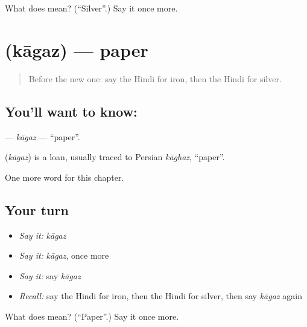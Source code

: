 \begin{tcolorbox}[breakable,colback=teal!4,colframe=teal!35!black,title={Before you move on}]
What does  mean? (\textquotedblleft{}Silver\textquotedblright{}.) Say it once more.
\end{tcolorbox}
\section[\texorpdfstring{\hi{काग़ज़} (kāgaz)}{काग़ज़ (kāgaz)}]{ (kāgaz) — paper}

\label{lesson:HI-C246-kagaz}



\begin{quote}
Before the new one: say the Hindi for iron, then the Hindi for silver.
\end{quote}

\subsection*{You'll want to know: }
\textbf{} — \emph{kāgaz} — \textquotedblleft{}paper\textquotedblright{}.

\begin{cousinweb}
\textbf{} (\emph{kāgaz}) is a loan, usually traced to Persian \emph{kāghaz}, \textquotedblleft{}paper\textquotedblright{}.
\end{cousinweb}

\begin{grammarlens}[title={What you've built}]
One more word for this chapter.
\end{grammarlens}

\subsection*{Your turn}
\begin{itemize}
\raggedright
  \item \emph{Say it:} \emph{kāgaz}
  \item \emph{Say it:} \emph{kāgaz}, once more
  \item \emph{Say it:} say \emph{kāgaz}
  \item \emph{Recall:} say the Hindi for iron, then the Hindi for silver, then say \emph{kāgaz} again
\end{itemize}

\begin{tcolorbox}[breakable,colback=teal!4,colframe=teal!35!black,title={Before you move on}]
What does  mean? (\textquotedblleft{}Paper\textquotedblright{}.) Say it once more.
\end{tcolorbox}
